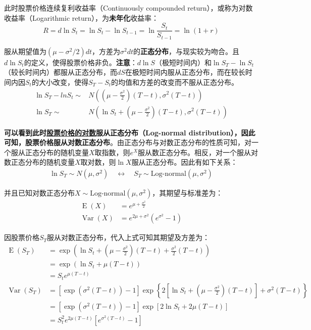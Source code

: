 \documentclass[11pt]{article}
\newcommand{\E}{\operatorname{E}}
\newcommand{\Var}{\operatorname{Var}}
\begin{document}
此时股票价格连续复利收益率（Continuously compounded return），或称为对数收益率（Logarithmic return），为\textbf{未年化}收益率：
\begin{equation}
    R = d\ln S_t= \ln S_t - \ln S_{t-1} = \ln \frac{S_t}{S_{t-1}} = \ln (1+r)
\end{equation}

服从期望值为$(\mu - \sigma^2/2)dt$，方差为$\sigma^2 dt$的\textbf{正态分布}，与现实较为吻合。且$d\ln S_t$的定义，使得股票价格非负。\textbf{注意}：$d\ln S$（极短时间内）和$\ln S_T - \ln S_t$（较长时间内）都服从正态分布，而$dS$在极短时间内服从正态分布，而在较长时间内因$S_t$的大小改变，使得$S_T - S_t$的均值和方差的改变而不服从正态分布。
\begin{align*}
    \ln S_T - ln S_t \sim & N \left( (\mu-\frac{\sigma^2}{2})(T-t), \sigma^2(T-t)\right) \\
    \ln S_T  \sim & N \left(\ln S_t + (\mu-\frac{\sigma^2}{2})(T-t), \sigma^2(T-t)\right)
\end{align*}

\textbf{可以看到此时\underline{股票价格的对数}服从正态分布（Log-normal distribution），因此可知，股票价格服从对数正态分布}。由正态分布与对数正态分布的性质可知，对一个服从正态分布的随机变量$X$取指数，则$e^X$服从数正态分布。相反，对一个服从对数正态分布的随机变量$X$取对数，则$\ln X$服从正态分布。因此有如下关系：
\begin{align*}
    \ln S_T \sim N(\mu,\sigma^2) \quad \leftrightarrow \quad S_T \sim \text{Log-normal}(\mu,\sigma^2)
\end{align*}

并且已知对数正态分布$X \sim \text{Log-normal}(\mu,\sigma^2)$，其期望与标准差为：
\begin{align*}
    \E(X) & = e^{\mu+\frac{\sigma^2}{2}} \\
    \Var(X) & = e^{2\mu+\sigma^2} (e^{\sigma^2}-1)
\end{align*}

因股票价格$S_T$服从对数正态分布，代入上式可知其期望及方差为：
\begin{align*}
    \E(S_T)   & = \exp(\ln S_t + (\mu - \frac{\sigma^2}{2})(T-t)+\frac{\sigma^2}{2}(T-t)) \\
    & = \exp(\ln S_t + \mu(T-t)) \\
    & = S_t e^{\mu(T-t)} \\
    \Var(S_T) & = \left[\exp(\sigma^2(T-t))-1\right] \exp \left\{2\left[\ln S_t + (\mu - \frac{\sigma^2}{2})(T-t)\right] + \sigma^2(T-t)\right\} \\
    & = \left[\exp(\sigma^2(T-t))-1\right] \exp\left[2 \ln S_t + 2\mu (T-t)\right] \\
    & = S_t^2 e^{2\mu(T-t)} \left[ e^{\sigma^2 (T-t)} - 1 \right]
\end{align*}
\end{document}
